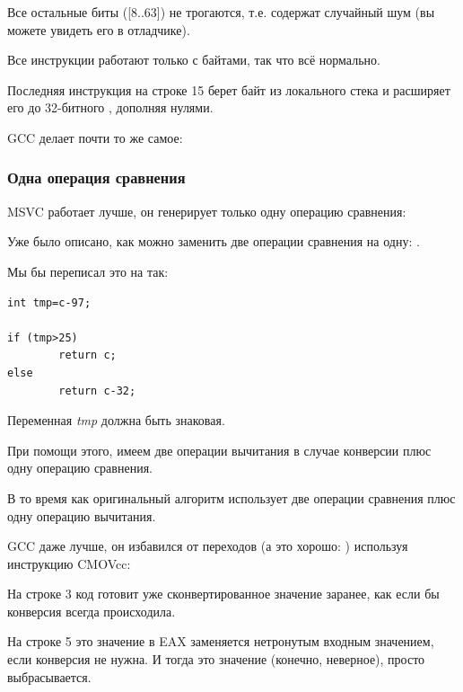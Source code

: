 Все остальные биты ([8..63]) не трогаются, т.е. содержат случайный шум (вы можете увидеть его в отладчике).

Все инструкции работают только с байтами, так что всё нормально.

Последняя инструкция  на строке 15 берет байт из локального стека и расширяет его 
до 32-битного \Tint, дополняя нулями.

\NonOptimizing GCC делает почти то же самое:



\subsubsection{Одна операция сравнения}
\label{toupper_one_comparison}

\Optimizing MSVC работает лучше, он генерирует только одну операцию сравнения:



Уже было описано, как можно заменить две операции сравнения на одну: .

Мы бы переписал это на \CCpp так:

\begin{lstlisting}[style=customc]
int tmp=c-97;

if (tmp>25)
        return c;
else
        return c-32;
\end{lstlisting}

Переменная \emph{tmp} должна быть знаковая.

При помощи этого, имеем две операции вычитания в случае конверсии плюс одну операцию сравнения.

В то время как оригинальный алгоритм использует две операции сравнения плюс одну операцию вычитания.

\Optimizing GCC 
даже лучше, он избавился от переходов (а это хорошо: ) используя инструкцию CMOVcc:



На строке 3 код готовит уже сконвертированное значение заранее, как если бы конверсия всегда происходила.

На строке 5 это значение в EAX заменяется нетронутым входным значением, если конверсия не нужна.
И тогда это значение (конечно, неверное), просто выбрасывается.

